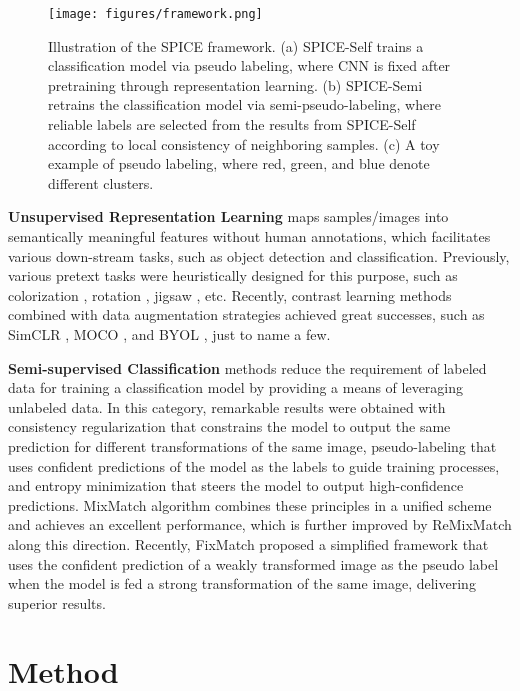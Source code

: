 \documentclass[10pt,twocolumn,letterpaper]{article}
\begin{document}
\begin{figure*}[bt!]
    \centering
    \texttt{[image: figures/framework.png]}
    \caption{Illustration of the SPICE framework. (a) SPICE-Self trains a classification model via pseudo labeling, where CNN is fixed after pretraining through representation learning. (b) SPICE-Semi retrains the classification model via semi-pseudo-labeling, where reliable labels are selected from the results from SPICE-Self according to local consistency of neighboring samples. (c) A toy example of pseudo labeling, where red, green, and blue denote different clusters.}
    \label{fig_framework}
\end{figure*}

\noindent \textbf{Unsupervised Representation Learning} maps samples/images into semantically meaningful features without human annotations, which facilitates various down-stream tasks, such as object detection and classification. Previously, various pretext tasks were heuristically designed for this purpose, such as colorization \cite{colorization2016}, rotation \cite{rotation2018}, jigsaw \cite{jigsaw2016}, etc.
Recently, contrast learning methods combined with data augmentation strategies achieved great successes, such as SimCLR \cite{simclr}, MOCO \cite{He_2020_CVPR}, and BYOL \cite{byol}, just to name a few.

\noindent \textbf{Semi-supervised Classification} methods reduce the requirement of labeled data for training a classification model by providing a means of leveraging unlabeled data. In this category, remarkable results were obtained with consistency regularization \cite{NIPS2016_30ef30b6, DBLP} that constrains the model to output the same prediction for different transformations of the same image, pseudo-labeling \cite{pseudo} that uses confident predictions of the model as the labels to guide training processes, and entropy minimization \cite{NIPS2004_96f2b50b, pseudo} that steers the model to output high-confidence predictions. MixMatch \cite{mixmatch} algorithm combines these principles in a unified scheme and achieves an excellent performance, which is further improved by ReMixMatch \cite{remixmatch} along this direction. Recently, FixMatch \cite{fixmatch} proposed a simplified framework that uses the confident prediction of a weakly transformed image as the pseudo label when the model is fed a strong transformation of the same image, delivering superior results.

\section{Method}
\end{document}

